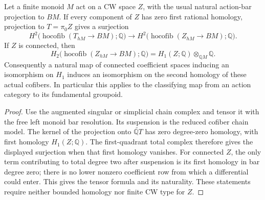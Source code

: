 \begin{lemma}
\label{C:action-space-low-degree-comparison}
Let a finite monoid $M$ act on a CW space $Z$, with the usual
natural action-bar projection to $BM$.
If every component of $Z$ has zero first rational homology,
projection to $T=\pi_0Z$ gives a surjection
\[
 H^2\bigl(\operatorname{hocofib}(T_{hM}\to BM);\mathbb Q\bigr)
 \longrightarrow
 H^2\bigl(\operatorname{hocofib}(Z_{hM}\to BM);\mathbb Q\bigr).
\]
If $Z$ is connected, then
\[
 H_2\bigl(\operatorname{hocofib}(Z_{hM}\to BM);\mathbb Q\bigr)
   =H_1(Z;\mathbb Q)\otimes_{\mathbb QM}\mathbb Q.
\]
Consequently a natural map of connected coefficient spaces
inducing an isomorphism on $H_1$ induces an isomorphism on the
second homology of these actual cofibers. In particular this
applies to the classifying map from an action category to its
fundamental groupoid.
\end{lemma}
\begin{proof}
Use the augmented singular or simplicial chain complex and
tensor it with the free left monoid bar resolution. Its
suspension is the reduced cofiber chain model. The kernel of
the projection onto $\widetilde{\mathbb QT}$ has zero
degree-zero homology, with first homology $H_1(Z;\mathbb Q)$.
The first-quadrant total complex therefore gives the displayed
surjection when that first homology vanishes.
For connected $Z$, the only term contributing to total degree
two after suspension is its first homology in bar degree zero;
there is no lower nonzero coefficient row from which a
differential could enter. This gives the tensor formula and
its naturality. These statements require neither bounded
homology nor finite CW type for $Z$.
\end{proof}

